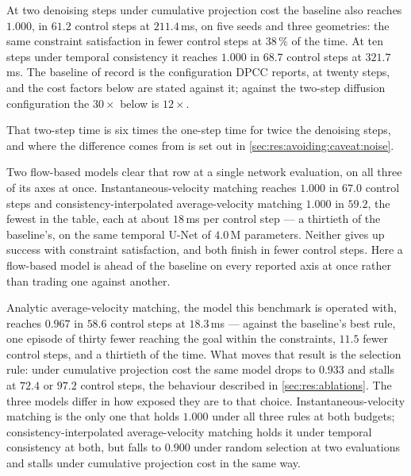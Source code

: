 At two denoising steps under cumulative projection cost the baseline also reaches $1.000$, in $61.2$
control steps at $211.4$\,ms, on five seeds and three geometries: the same constraint satisfaction in
fewer control steps at $38\,\%$ of the time. At ten steps under temporal consistency it reaches $1.000$
in $68.7$ control steps at $321.7$\,ms. The baseline of record is
the configuration \ac{DPCC} reports, at twenty steps, and the cost factors below are stated against it;
against the two-step diffusion configuration the $30\times$ below is $12\times$.

That two-step time is six times the one-step time for twice the denoising steps, and where the
difference comes from is set out in \autoref{sec:res:avoiding:caveat:noise}.

Two flow-based models clear that row at a single network evaluation, on all three of its axes at once.
Instantaneous-velocity matching reaches $1.000$ in $67.0$ control steps and consistency-interpolated
average-velocity matching $1.000$ in $59.2$, the fewest in the table, each at about $18$\,ms per control
step --- a thirtieth of the baseline's, on the same temporal U-Net of $4.0$\,M parameters. Neither gives
up success with constraint satisfaction, and both finish in fewer control steps. Here a flow-based model
is ahead of the baseline on every reported axis at once rather than trading one against another.

Analytic average-velocity matching, the model this benchmark is operated with, reaches $0.967$ in $58.6$
control steps at $18.3$\,ms --- against the baseline's best rule, one episode of thirty fewer reaching
the goal within the constraints, $11.5$ fewer control steps, and a thirtieth of the time. What moves that
result is the selection rule: under cumulative projection cost the same model drops to $0.933$ and stalls
at $72.4$ or $97.2$ control steps, the
behaviour described in \autoref{sec:res:ablations}. The three models differ in how exposed they are to
that choice. Instantaneous-velocity matching is the only one that holds $1.000$ under all three rules at
both budgets; consistency-interpolated average-velocity matching holds it under temporal consistency at
both, but falls to $0.900$ under random selection at two evaluations and stalls under cumulative
projection cost in the same way.

